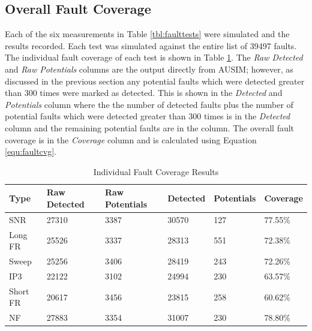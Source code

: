 \documentclass[12pt]{report}
\begin{document}
\subsection{Overall Fault Coverage}
Each of the six measurements in Table \ref{tbl:faulttests} were simulated and the results recorded.  Each test was simulated against the entire list of 39497 faults.  The individual fault coverage of each test is shown in Table \ref{tbl:faultresults}.  The \textit{Raw Detected} and \textit{Raw Potentials} columns are the output directly from AUSIM; however, as discussed in the previous section any potential faults which were detected greater than 300 times were marked as detected.  This is shown in the \textit{Detected} and \textit{Potentials} column where the the number of detected faults plus the number of potential faults which were detected greater than 300 times is in the \textit{Detected} column and the remaining potential faults are in the  column.  The overall fault coverage is in the \textit{Coverage} column and is calculated using Equation \ref{equ:faultcvg}.
\begin{table}
  \begin{center}
    \caption{Individual Fault Coverage Results}
    \label{tbl:faultresults}
    \begin{tabular}{|l|l|l|l|l|l|}
      \hline
      Type & Raw Detected & Raw Potentials & Detected & Potentials & Coverage \\ \hline
      SNR & 27310 & 3387 & 30570 & 127 & 77.55\% \\ \hline
      Long FR & 25526 & 3337 & 28313 & 551 & 72.38\% \\ \hline
      Sweep & 25256 & 3406 & 28419 & 243 & 72.26\% \\ \hline 
      IP3 & 22122 & 3102 & 24994 & 230 & 63.57\% \\ \hline
      Short FR & 20617 & 3456 & 23815 & 258 & 60.62\% \\ \hline 
      NF & 27883 & 3354 & 31007 & 230 & 78.80\% \\ 
      \hline
    \end{tabular}
  \end{center}
\end{table}
\end{document}
